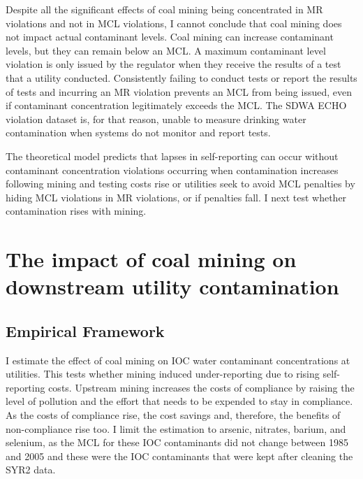 \documentclass[12pt]{article}
\begin{document}
Despite all the significant effects of coal mining being concentrated in MR violations and not in MCL violations, I cannot conclude that coal mining does not impact actual contaminant levels. Coal mining can increase contaminant levels, but they can remain below an MCL. A maximum contaminant level violation is only issued by the regulator when they receive the results of a test that a utility conducted. Consistently failing to conduct tests or report the results of tests and incurring an MR violation prevents an MCL from being issued, even if contaminant concentration legitimately exceeds the MCL. The SDWA ECHO violation dataset is, for that reason, unable to measure drinking water contamination when systems do not monitor and report tests. 

The theoretical model predicts that lapses in self-reporting can occur without contaminant concentration violations occurring when contamination increases following mining and testing costs rise or utilities seek to avoid MCL penalties by hiding MCL violations in MR violations, or if penalties fall. I next test whether contamination rises with mining.

\begin{landscape}

\end{landscape}





\section{The impact of coal mining on downstream utility contamination}

\subsection{Empirical Framework}

I estimate the effect of coal mining on IOC water contaminant concentrations at utilities. This tests whether mining induced under-reporting due to rising self-reporting costs. Upstream mining increases the costs of compliance by raising the level of pollution and the effort that needs to be expended to stay in compliance. As the costs of compliance rise, the cost savings and, therefore, the benefits of non-compliance rise too. I limit the estimation to arsenic, nitrates, barium, and selenium, as the MCL for these IOC contaminants did not change between 1985 and 2005 and these were the IOC contaminants that were kept after cleaning the SYR2 data.
\end{document}
